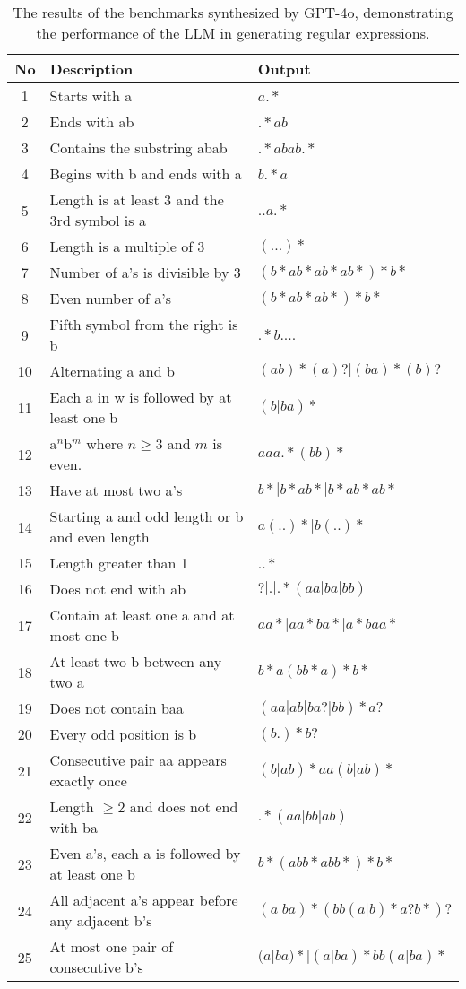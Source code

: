 \begin{table}[h!]
	\centering
	\caption{The results of the benchmarks synthesized by GPT-4o, demonstrating the performance of the LLM in generating regular expressions.}
	\label{tab:llm_outputs}
	\begin{tabular}{|c|l|l|}
	\hline
	\textbf{No} & \textbf{Description} & \textbf{Output} \\
	\hline
	1 & Starts with a & $a.*$  \\
	2 & Ends with ab & $.*ab$ \\
	3 & Contains the substring abab & $.*abab.*$ \\
	4 & Begins with b and ends with a & $b.*a$ \\
	5 & Length is at least 3 and the 3rd symbol is a & $..a.*$ \\
	6 & Length is a multiple of 3 & $(...)*$ \\
	7 & Number of a's is divisible by 3 & $(b*ab*ab*ab*)*b*$ \\
	8 & Even number of a's & $(b*ab*ab*)*b*$ \\
	9 & Fifth symbol from the right is b & $.*b....$ \\
	10 & Alternating a and b & $(ab)*(a)?|(ba)*(b)?$ \\
	11 & Each a in w is followed by at least one b & $(b|ba)*$ \\
	12 & a$^n$b$^m$ where $n \geq 3$ and $m$ is even. & $aaa.*(bb)*$ \\ %
	13 & Have at most two a's & $b*|b*ab*|b*ab*ab*$ \\ 
	14 & Starting a and odd length or b and even length & $a(..)* | b(..)*$ \\ %
	15 & Length greater than 1 & $..*$ \\ %
	16 & Does not end with ab & $?|.|.*(aa|ba|bb)$ \\ %
	17 & Contain at least one a and at most one b & $aa*|aa*ba*|a*baa*$ \\
	18 & At least two b between any two a & $b*a(bb*a)*b*$ \\ %
	19 & Does not contain baa & $(aa|ab|ba?|bb)*a?$ \\ %
	20 & Every odd position is b & $(b.)*b?$ \\
	21 & Consecutive pair aa appears exactly once & $(b|ab)*aa(b|ab)*$ \\ %
	22 & Length $\ge 2$ and does not end with ba & $.*(aa|bb|ab)$ \\
	23 & Even a's, each a is followed by at least one b & $b*(abb*abb*)*b*$ \\ %
	24 & All adjacent a's appear before any adjacent b's & $(a|ba)*(bb(a|b)*a?b*)?$ \\ %
	25 & At most one pair of consecutive b's & $(a|ba)* | (a|ba)*bb(a|ba)*$ \\ %
	\hline
\end{tabular}
\end{table}

